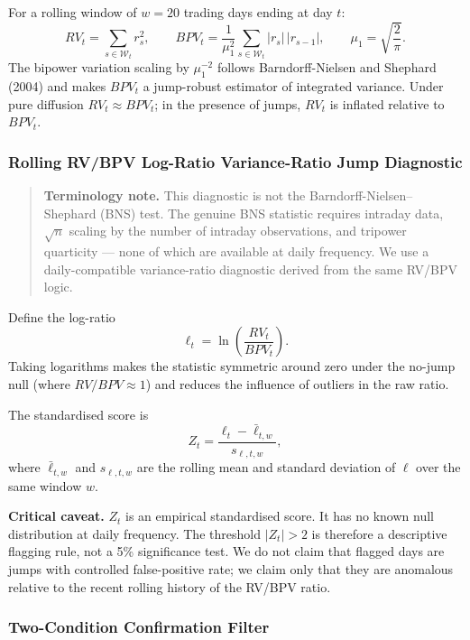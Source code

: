 \documentclass[12pt]{article}
\begin{document}
For a rolling window of $w=20$ trading days ending at day $t$:
\[
RV_t=\sum_{s\in\mathcal{W}_t} r_s^2,
\qquad
BPV_t=\frac{1}{\mu_1^2}\sum_{s\in\mathcal{W}_t} |r_s|\,|r_{s-1}|,
\qquad
\mu_1=\sqrt{\frac{2}{\pi}}.
\]
The bipower variation scaling by $\mu_1^{-2}$ follows Barndorff-Nielsen and Shephard (2004) and makes $BPV_t$ a jump-robust estimator of integrated variance. Under pure diffusion $RV_t \approx BPV_t$; in the presence of jumps, $RV_t$ is inflated relative to $BPV_t$.

\subsubsection*{Rolling RV/BPV Log-Ratio Variance-Ratio Jump Diagnostic}

\begin{quote}
\textbf{Terminology note.} This diagnostic is not the Barndorff-Nielsen--Shephard (BNS) test. The genuine BNS statistic requires intraday data, $\sqrt{n}$ scaling by the number of intraday observations, and tripower quarticity --- none of which are available at daily frequency. We use a daily-compatible variance-ratio diagnostic derived from the same RV/BPV logic.
\end{quote}

Define the log-ratio
\begin{equation}
\ell_t=\ln\left(\frac{RV_t}{BPV_t}\right).
\label{eq:logratio}
\end{equation}
Taking logarithms makes the statistic symmetric around zero under the no-jump null (where $RV/BPV \approx 1$) and reduces the influence of outliers in the raw ratio.

The standardised score is
\begin{equation}
Z_t=\frac{\ell_t-\bar{\ell}_{t,w}}{s_{\ell,t,w}},
\label{eq:Zt}
\end{equation}
where $\bar{\ell}_{t,w}$ and $s_{\ell,t,w}$ are the rolling mean and standard deviation of $\ell$ over the same window $w$.

\medskip
\noindent\textbf{Critical caveat.} $Z_t$ is an empirical standardised score. It has no known null distribution at daily frequency. The threshold $|Z_t|>2$ is therefore a descriptive flagging rule, not a 5\% significance test. We do not claim that flagged days are jumps with controlled false-positive rate; we claim only that they are anomalous relative to the recent rolling history of the RV/BPV ratio.

\subsubsection*{Two-Condition Confirmation Filter}
\end{document}
